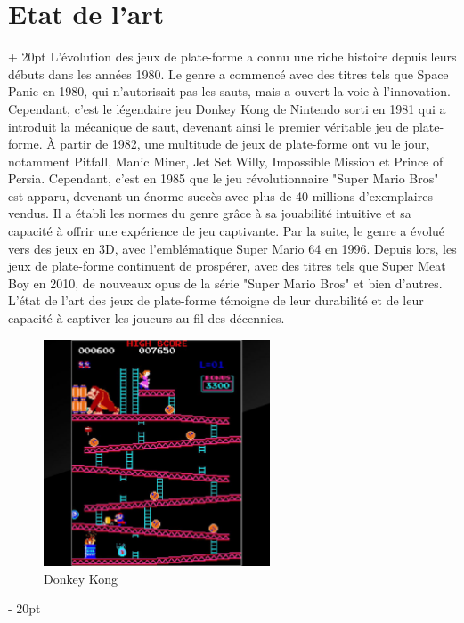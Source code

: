 \documentclass[a4paper, 12pt, twoside]{article}
\newcommand{\ind}[1][20pt]{\advance\leftskip + #1}
\newcommand{\deind}[1][20pt]{\advance\leftskip - #1}
\newenvironment{indt}[2][20pt]{#2 \par \ind[#1]}{\par \deind} %
\begin{document}
    \begin{indt}{\section{Etat de l’art}}
        L'évolution des jeux de plate-forme a connu une riche histoire depuis leurs débuts dans les années 1980. Le genre a commencé avec des titres tels que Space Panic en 1980, qui n'autorisait pas les sauts, mais a ouvert la voie à l'innovation. Cependant, c'est le légendaire jeu Donkey Kong de Nintendo sorti en 1981 qui a introduit la mécanique de saut, devenant ainsi le premier véritable jeu de plate-forme. À partir de 1982, une multitude de jeux de plate-forme ont vu le jour, notamment Pitfall, Manic Miner, Jet Set Willy, Impossible Mission et Prince of Persia. Cependant, c'est en 1985 que le jeu révolutionnaire "Super Mario Bros" est apparu, devenant un énorme succès avec plus de 40 millions d'exemplaires vendus. Il a établi les normes du genre grâce à sa jouabilité intuitive et sa capacité à offrir une expérience de jeu captivante. Par la suite, le genre a évolué vers des jeux en 3D, avec l'emblématique Super Mario 64 en 1996. Depuis lors, les jeux de plate-forme continuent de prospérer, avec des titres tels que Super Meat Boy en 2010, de nouveaux opus de la série "Super Mario Bros" et bien d'autres. L'état de l'art des jeux de plate-forme témoigne de leur durabilité et de leur capacité à captiver les joueurs au fil des décennies.

        \begin{figure}[h]
            \centering
            \includegraphics[width=0.6\textwidth]{SMB2.jpg}
            \caption{Donkey Kong}
            \label{fig:mesh1}
        \end{figure}
    \end{indt}
\end{document}
